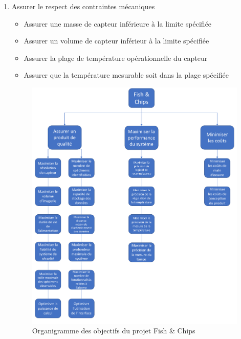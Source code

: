 \begin{enumerate}
    \item Assurer le respect des contraintes mécaniques
    \begin{itemize}
        \item Assurer une masse de capteur inférieure à la limite spécifiée
        \item Assurer un volume de capteur inférieur à la limite spécifiée
        \item Assurer la plage de température opérationnelle du capteur
        \item Assurer que la température mesurable soit dans la plage spécifiée
    \end{itemize}
    
    
    \newpage
    
    \begin{figure}
        \centering
        \includegraphics[width=1.0\linewidth]{fig/organigramme.pdf}
        \caption{Organigramme des objectifs du projet Fish \& Chips}
        \label{fig:organigramme}
    \end{figure}
    
    
\end{enumerate}
